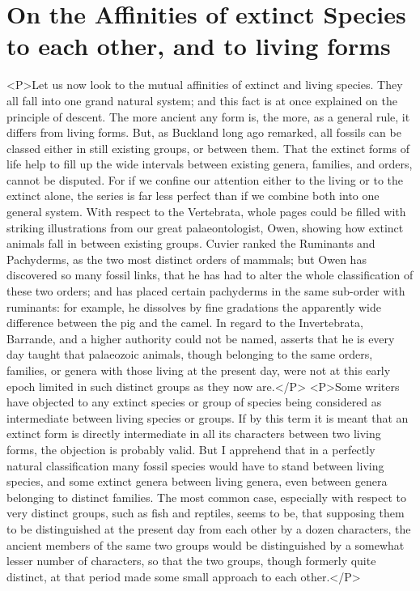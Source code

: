 \section{On the Affinities of extinct Species to each other, and to living forms}
<P>Let us now look to the mutual affinities of extinct and living species. They all fall into one grand natural system; and this fact is at once explained on the principle of descent. The more ancient any form is, the more, as a general rule, it differs from living forms. But, as Buckland long ago remarked, all fossils can be classed either in still existing groups, or between them.  That the extinct forms of life help to fill up the wide intervals between existing genera, families, and orders, cannot be disputed.  For if we confine our attention either to the living or to the extinct alone, the series is far less perfect than if we combine both into one general system. With respect to the Vertebrata, whole pages could be filled with striking illustrations from our great palaeontologist, Owen, showing how extinct animals fall in between existing groups. Cuvier ranked the Ruminants and Pachyderms, as the two most distinct orders of mammals; but Owen has discovered so many fossil links, that he has had to alter the whole classification of these two orders; and has placed certain pachyderms in the same sub-order with ruminants: for example, he dissolves by fine gradations the apparently wide difference between the pig and the camel. In regard to the Invertebrata, Barrande, and a higher authority could not be named, asserts that he is every day taught that palaeozoic animals, though belonging to the same orders, families, or genera with those living at the present day, were not at this early epoch limited in such distinct groups as they now are.</P>
<P>Some writers have objected to any extinct species or group of species being considered as intermediate between living species or groups. If by this term it is meant that an extinct form is directly intermediate in all its characters between two living forms, the objection is probably valid. But I apprehend that in a perfectly natural classification many fossil species would have to stand between living species, and some extinct genera between living genera, even between genera belonging to distinct families. The most common case, especially with respect to very distinct groups, such as fish and reptiles, seems to be, that supposing them to be distinguished at the present day from each other by a dozen characters, the ancient members of the same two groups would be distinguished by a somewhat lesser number of characters, so that the two groups, though formerly quite distinct, at that period made some small approach to each other.</P>
